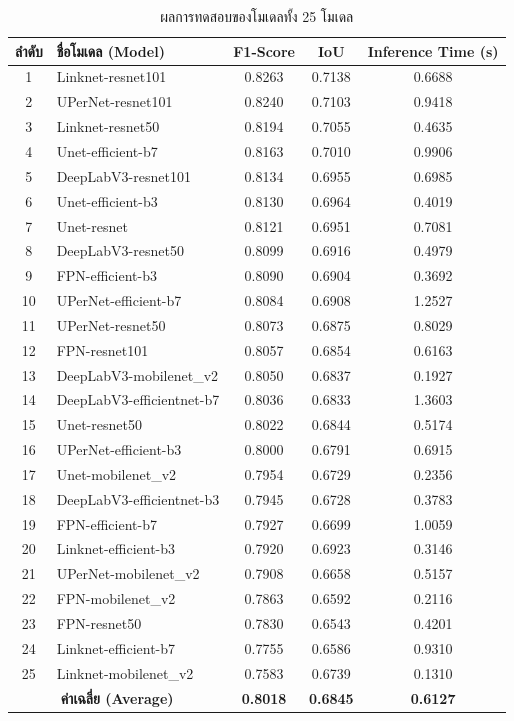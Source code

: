 \begin{table}[H]
\centering
\caption{ผลการทดสอบของโมเดลทั้ง 25 โมเดล}
\label{tab:all_models}
\begin{tabular}{|c|l|c|c|c|}
\hline
\textbf{ลำดับ} & \textbf{ชื่อโมเดล (Model)} & \textbf{F1-Score} & \textbf{IoU} & \textbf{Inference Time (s)} \\
\hline
1 & Linknet-resnet101 & 0.8263 & 0.7138 & 0.6688 \\
2 & UPerNet-resnet101 & 0.8240 & 0.7103 & 0.9418 \\
3 & Linknet-resnet50 & 0.8194 & 0.7055 & 0.4635 \\
4 & Unet-efficient-b7 & 0.8163 & 0.7010 & 0.9906 \\
5 & DeepLabV3-resnet101 & 0.8134 & 0.6955 & 0.6985 \\
6 & Unet-efficient-b3 & 0.8130 & 0.6964 & 0.4019 \\
7 & Unet-resnet & 0.8121 & 0.6951 & 0.7081 \\
8 & DeepLabV3-resnet50 & 0.8099 & 0.6916 & 0.4979 \\
9 & FPN-efficient-b3 & 0.8090 & 0.6904 & 0.3692 \\
10 & UPerNet-efficient-b7 & 0.8084 & 0.6908 & 1.2527 \\
11 & UPerNet-resnet50 & 0.8073 & 0.6875 & 0.8029 \\
12 & FPN-resnet101 & 0.8057 & 0.6854 & 0.6163 \\
13 & DeepLabV3-mobilenet\_v2 & 0.8050 & 0.6837 & 0.1927 \\
14 & DeepLabV3-efficientnet-b7 & 0.8036 & 0.6833 & 1.3603 \\
15 & Unet-resnet50 & 0.8022 & 0.6844 & 0.5174 \\
16 & UPerNet-efficient-b3 & 0.8000 & 0.6791 & 0.6915 \\
17 & Unet-mobilenet\_v2 & 0.7954 & 0.6729 & 0.2356 \\
18 & DeepLabV3-efficientnet-b3 & 0.7945 & 0.6728 & 0.3783 \\
19 & FPN-efficient-b7 & 0.7927 & 0.6699 & 1.0059 \\
20 & Linknet-efficient-b3 & 0.7920 & 0.6923 & 0.3146 \\
21 & UPerNet-mobilenet\_v2 & 0.7908 & 0.6658 & 0.5157 \\
22 & FPN-mobilenet\_v2 & 0.7863 & 0.6592 & 0.2116 \\
23 & FPN-resnet50 & 0.7830 & 0.6543 & 0.4201 \\
24 & Linknet-efficient-b7 & 0.7755 & 0.6586 & 0.9310 \\
25 & Linknet-mobilenet\_v2 & 0.7583 & 0.6739 & 0.1310 \\
\hline
\multicolumn{2}{|c|}{\textbf{ค่าเฉลี่ย (Average)}} & \textbf{0.8018} & \textbf{0.6845} & \textbf{0.6127} \\
\hline
\end{tabular}
\end{table}


